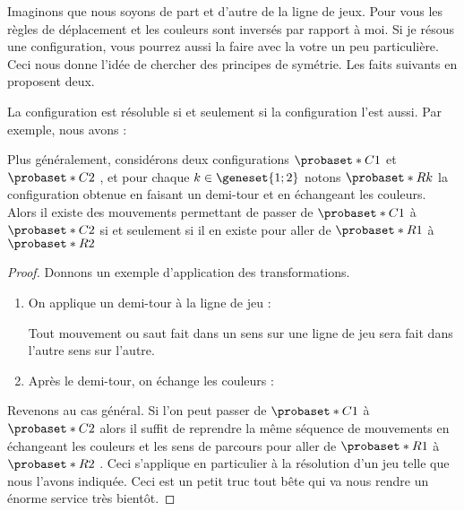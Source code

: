 Imaginons que nous soyons de part et d'autre de la ligne de jeux.
Pour vous les règles de déplacement et les couleurs sont inversés par rapport à moi.
Si je résous une configuration, vous pourrez aussi la faire avec la votre un peu particulière.
Ceci nous donne l'idée de chercher des principes de symétrie. Les faits suivants en proposent deux.



\begin{fact} \label{symmetry-color}
	La configuration  est résoluble si et seulement si la configuration  l'est aussi. 
	Par exemple, nous avons :
	
	
	\medskip
	
	Plus généralement, considérons deux configurations $\probaset*{C}{1}$ et $\probaset*{C}{2}$ , et pour chaque $k \in \geneset{1 ; 2}$ notons $\probaset*{R}{k}$ la configuration obtenue en faisant un demi-tour et en échangeant les couleurs.
	Alors il existe des mouvements permettant de passer de $\probaset*{C}{1}$ à $\probaset*{C}{2}$ si et seulement si il en existe pour aller de $\probaset*{R}{1}$ à $\probaset*{R}{2}$  
\end{fact}


\begin{proof}
	Donnons un exemple d'application des transformations.
	\begin{enumerate}
		\item On applique un demi-tour à la ligne de jeu :
		
		\noindent
		Tout mouvement ou saut fait dans un sens sur une ligne de jeu sera fait dans l'autre sens sur l'autre.

		\item Après le demi-tour, on échange les couleurs :
	\end{enumerate}
	
	Revenons au cas général.
	Si l'on peut passer de $\probaset*{C}{1}$ à $\probaset*{C}{2}$ alors il suffit de reprendre la même séquence de mouvements en échangeant les couleurs et les sens de parcours pour aller de $\probaset*{R}{1}$ à $\probaset*{R}{2}$ .
	Ceci s'applique en particulier à la résolution d'un jeu telle que nous l'avons indiquée. 
	Ceci est un petit truc tout bête qui va nous rendre un énorme service très bientôt.
\end{proof}


